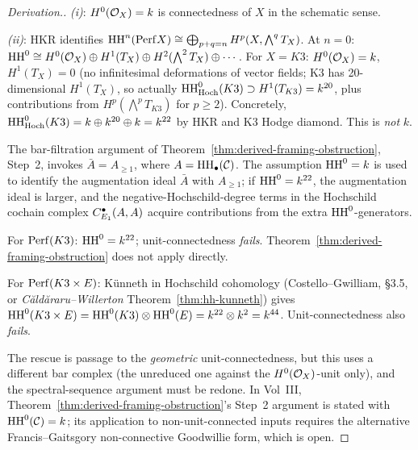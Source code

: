 \begin{proof}[Derivation.]
\emph{(i)}: $H^0(\mathcal{O}_X) = k$ is connectedness of $X$ in the
schematic sense.

\emph{(ii)}: HKR identifies
$\mathrm{HH}^n(\mathrm{Perf} X) \cong \bigoplus_{p+q = n} H^p(X, \bigwedge^q T_X)$.
At $n = 0$: $\mathrm{HH}^0 \cong H^0(\mathcal{O}_X) \oplus H^1(T_X) \oplus
H^2(\bigwedge^2 T_X) \oplus \cdots$. For $X = K3$:
$H^0(\mathcal{O}_X) = k$, $H^1(T_X) = 0$ (no infinitesimal deformations
of vector fields; K3 has 20-dimensional $H^1(T_X)$, so actually
$\mathrm{HH}^0_{\mathrm{Hoch}}(K3) \supset H^1(T_{K3}) = k^{20}$, plus
contributions from $H^p(\bigwedge^p T_{K3})$ for $p \geq 2$).
Concretely, $\mathrm{HH}^0_{\mathrm{Hoch}}(K3) = k \oplus k^{20} \oplus k = k^{22}$
by HKR and K3 Hodge diamond. This is \emph{not} $k$.

The bar-filtration argument of
Theorem~\ref{thm:derived-framing-obstruction}, Step~2,
invokes $\bar A = A_{\geq 1}$, where
$A = \mathrm{HH}_\bullet(\mathcal{C})$. The assumption $\mathrm{HH}^0 = k$ is used to
identify the augmentation ideal $\bar A$ with $A_{\geq 1}$; if
$\mathrm{HH}^0 = k^{22}$, the augmentation ideal is larger, and the
negative-Hochschild-degree terms in the Hochschild cochain
complex $C^\bullet_{E_1}(A, A)$ acquire contributions from the
extra $\mathrm{HH}^0$-generators.

For $\mathrm{Perf}(K3)$: $\mathrm{HH}^0 = k^{22}$; unit-connectedness
\emph{fails}. Theorem~\ref{thm:derived-framing-obstruction}
does not apply directly.

For $\mathrm{Perf}(K3 \times E)$: K\"unneth in Hochschild cohomology
(Costello--Gwilliam, \S 3.5, or \emph{C\u{a}ld\u{a}raru--Willerton}
Theorem~\ref{thm:hh-kunneth}) gives
$\mathrm{HH}^0(K3 \times E) = \mathrm{HH}^0(K3) \otimes \mathrm{HH}^0(E) = k^{22} \otimes k^2 = k^{44}$.
Unit-connectedness also \emph{fails}.

The rescue is passage to the \emph{geometric} unit-connectedness,
but this uses a different bar complex (the unreduced one
against the $H^0(\mathcal{O}_X)$-unit only), and the spectral-sequence
argument must be redone.  In Vol~III,
Theorem~\ref{thm:derived-framing-obstruction}'s Step~2 argument
is stated with $\mathrm{HH}^0(\mathcal{C}) = k$; its application to
non-unit-connected inputs requires the alternative
Francis--Gaitsgory non-connective Goodwillie form, which is open.
\end{proof}

